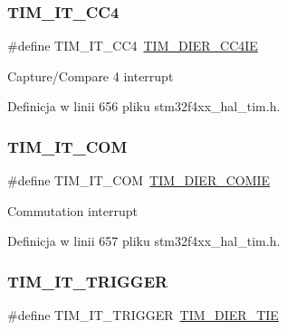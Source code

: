 \subsubsection{\texorpdfstring{T\+I\+M\+\_\+\+I\+T\+\_\+\+C\+C4}{TIM\_IT\_CC4}}
{\footnotesize\ttfamily \#define T\+I\+M\+\_\+\+I\+T\+\_\+\+C\+C4~\hyperlink{group___peripheral___registers___bits___definition_ga6ad0f562a014572793b49fe87184338b}{T\+I\+M\+\_\+\+D\+I\+E\+R\+\_\+\+C\+C4\+IE}}

Capture/\+Compare 4 interrupt 

Definicja w linii 656 pliku stm32f4xx\+\_\+hal\+\_\+tim.\+h.

\mbox{\label{group___t_i_m___interrupt__definition_gaeb7eff6c39922814e7ee47c0820c3d9f}} 
\subsubsection{\texorpdfstring{T\+I\+M\+\_\+\+I\+T\+\_\+\+C\+OM}{TIM\_IT\_COM}}
{\footnotesize\ttfamily \#define T\+I\+M\+\_\+\+I\+T\+\_\+\+C\+OM~\hyperlink{group___peripheral___registers___bits___definition_gade8a374e04740aac1ece248b868522fe}{T\+I\+M\+\_\+\+D\+I\+E\+R\+\_\+\+C\+O\+M\+IE}}

Commutation interrupt 

Definicja w linii 657 pliku stm32f4xx\+\_\+hal\+\_\+tim.\+h.

\mbox{\label{group___t_i_m___interrupt__definition_ga2a577f2eee61f101cf551d86c4d73333}} 
\subsubsection{\texorpdfstring{T\+I\+M\+\_\+\+I\+T\+\_\+\+T\+R\+I\+G\+G\+ER}{TIM\_IT\_TRIGGER}}
{\footnotesize\ttfamily \#define T\+I\+M\+\_\+\+I\+T\+\_\+\+T\+R\+I\+G\+G\+ER~\hyperlink{group___peripheral___registers___bits___definition_gaa755fef2c4e96c63f2ea1cd9a32f956a}{T\+I\+M\+\_\+\+D\+I\+E\+R\+\_\+\+T\+IE}}

